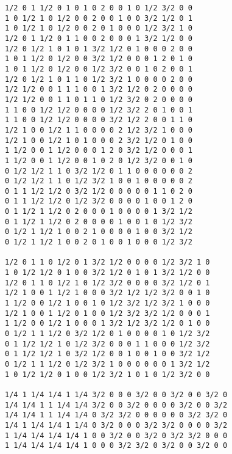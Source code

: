 \documentclass[10p,a4paper,BCOR = 12mm, DIV=15]{scrbook}
\begin{document}
{\begin{verbatim}
1/2 0 1 1/2 0 1 0 1 0 2 0 0 1 0 1/2 3/2 0 0
1 0 1/2 1 0 1/2 0 0 2 0 0 1 0 0 3/2 1/2 0 1
1 0 1/2 1 0 1/2 0 0 2 0 1 0 0 0 1/2 3/2 1 0
1/2 0 1 1/2 0 1 1 0 0 2 0 0 0 1 3/2 1/2 0 0
1/2 0 1/2 1 0 1 0 1 3/2 1/2 0 1 0 0 0 2 0 0
1 0 1 1/2 0 1/2 0 0 3/2 1/2 0 0 0 1 2 0 1 0
1 0 1 1/2 0 1/2 0 0 1/2 3/2 0 0 1 0 2 0 0 1
1/2 0 1/2 1 0 1 1 0 1/2 3/2 1 0 0 0 0 2 0 0
1/2 1/2 0 0 1 1 1 0 0 1 3/2 1/2 0 2 0 0 0 0
1/2 1/2 0 0 1 1 0 1 1 0 1/2 3/2 0 2 0 0 0 0
1 1 0 0 1/2 1/2 0 0 0 0 1/2 3/2 2 0 1 0 0 1
1 1 0 0 1/2 1/2 0 0 0 0 3/2 1/2 2 0 0 1 1 0
1/2 1 0 0 1/2 1 1 0 0 0 0 2 1/2 3/2 1 0 0 0
1/2 1 0 0 1/2 1 0 1 0 0 0 2 3/2 1/2 0 1 0 0
1 1/2 0 0 1 1/2 0 0 0 1 2 0 3/2 1/2 0 0 0 1
1 1/2 0 0 1 1/2 0 0 1 0 2 0 1/2 3/2 0 0 1 0
0 1/2 1/2 1 1 0 3/2 1/2 0 1 1 0 0 0 0 0 0 2
0 1/2 1/2 1 1 0 1/2 3/2 1 0 0 1 0 0 0 0 0 2
0 1 1 1/2 1/2 0 3/2 1/2 0 0 0 0 0 1 1 0 2 0
0 1 1 1/2 1/2 0 1/2 3/2 0 0 0 0 1 0 0 1 2 0
0 1 1/2 1 1/2 0 2 0 0 0 1 0 0 0 0 1 3/2 1/2
0 1 1/2 1 1/2 0 2 0 0 0 0 1 0 0 1 0 1/2 3/2
0 1/2 1 1/2 1 0 0 2 1 0 0 0 0 1 0 0 3/2 1/2
0 1/2 1 1/2 1 0 0 2 0 1 0 0 1 0 0 0 1/2 3/2

1/2 0 1 1 0 1/2 0 1 3/2 1/2 0 0 0 0 1/2 3/2 1 0
1 0 1/2 1/2 0 1 0 0 3/2 1/2 0 1 0 1 3/2 1/2 0 0
1/2 0 1 1 0 1/2 1 0 1/2 3/2 0 0 0 0 3/2 1/2 0 1
1/2 1 0 0 1 1/2 1 0 0 0 3/2 1/2 1/2 3/2 0 0 1 0
1 1/2 0 0 1/2 1 0 0 1 0 1/2 3/2 1/2 3/2 1 0 0 0
1/2 1 0 0 1 1/2 0 1 0 0 1/2 3/2 3/2 1/2 0 0 0 1
1 1/2 0 0 1/2 1 0 0 0 1 3/2 1/2 3/2 1/2 0 1 0 0
0 1/2 1 1 1/2 0 3/2 1/2 0 1 0 0 0 0 1 0 1/2 3/2
0 1 1/2 1/2 1 0 1/2 3/2 0 0 0 1 1 0 0 0 1/2 3/2
0 1 1/2 1/2 1 0 3/2 1/2 0 0 1 0 0 1 0 0 3/2 1/2
0 1/2 1 1 1/2 0 1/2 3/2 1 0 0 0 0 0 0 1 3/2 1/2
1 0 1/2 1/2 0 1 0 0 1/2 3/2 1 0 1 0 1/2 3/2 0 0

1/4 1 1/4 1/4 1 1/4 3/2 0 0 0 3/2 0 0 3/2 0 0 3/2 0
1/4 1/4 1 1 1/4 1/4 3/2 0 0 3/2 0 0 0 0 3/2 0 0 3/2
1/4 1/4 1 1 1/4 1/4 0 3/2 3/2 0 0 0 0 0 0 3/2 3/2 0
1/4 1 1/4 1/4 1 1/4 0 3/2 0 0 0 3/2 3/2 0 0 0 0 3/2
1 1/4 1/4 1/4 1/4 1 0 0 3/2 0 0 3/2 0 3/2 3/2 0 0 0
1 1/4 1/4 1/4 1/4 1 0 0 0 3/2 3/2 0 3/2 0 0 3/2 0 0


\end{verbatim}}
\end{document}
